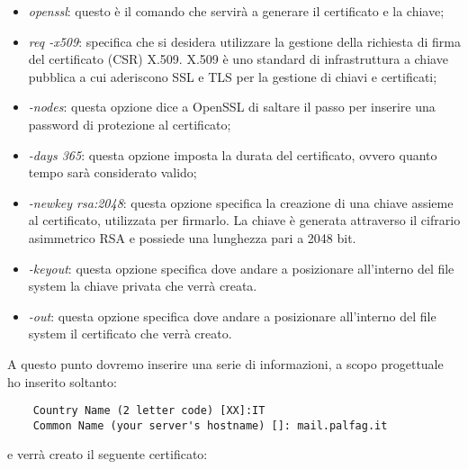 \begin{itemize}
    \item \textit{openssl}: questo è il comando che servirà a generare il certificato e la chiave;
    \item \textit{req -x509}: specifica che si desidera utilizzare la gestione della richiesta di firma del certificato 
    (CSR) X.509. X.509 è uno standard di infrastruttura a chiave pubblica a cui aderiscono SSL e TLS per la gestione 
    di chiavi e certificati;
    \item \textit{-nodes}: questa opzione dice a OpenSSL di saltare il passo per inserire una password di protezione al certificato;
    \item \textit{-days 365}: questa opzione imposta la durata del certificato, ovvero quanto tempo sarà considerato
    valido;
    \item \textit{-newkey rsa:2048}: questa opzione specifica la creazione di una chiave assieme al certificato, 
    utilizzata per firmarlo. La chiave è generata attraverso il cifrario asimmetrico RSA 
    e possiede una lunghezza pari a 2048 bit.
    \item \textit{-keyout}: questa opzione specifica dove andare a posizionare all’interno del 
    file system la chiave privata che verrà creata.
    \item \textit{-out}: questa opzione specifica dove andare a posizionare all’interno del file system il certificato che verrà creato.
\end{itemize}

A questo punto dovremo inserire una serie di informazioni, a scopo progettuale ho inserito soltanto:

\begin{verbatim}
    Country Name (2 letter code) [XX]:IT
    Common Name (your server's hostname) []: mail.palfag.it
\end{verbatim}

e verrà creato il seguente certificato:

